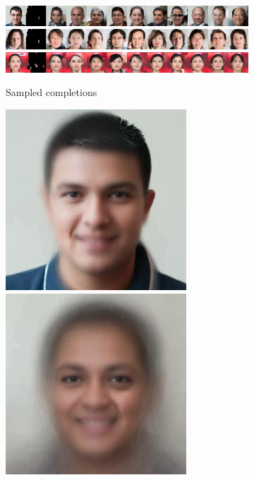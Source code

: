 \begin{figure}[t]
\begin{subfigure}[t]{0.73\textwidth}
    \includegraphics[trim=512px 0px 0px 0px, clip, height=\cmgfailureimgheight]{figs/cigcvae/co_mod_gan_failure/aipo_0_4_2.jpg}
    \includegraphics[trim=512px 0px 0px 0px, clip, height=\cmgfailureimgheight]{figs/cigcvae/co_mod_gan_failure/aipo_1_4_2.jpg}
    \includegraphics[trim=512px 0px 0px 0px, clip, height=\cmgfailureimgheight]{figs/cigcvae/co_mod_gan_failure/aipo_56_4_12.jpg}
    \caption{\scriptsize Sampled completions}
  \end{subfigure}
  \begin{subfigure}[t]{0.1\textwidth}
    \centering
    \includegraphics[height=\cmgfailureimgheight]{figs/cigcvae/co_mod_gan_failure/avg_aipo_0_3_2.jpg}
    \includegraphics[height=\cmgfailureimgheight]{figs/cigcvae/co_mod_gan_failure/avg_aipo_0_4_2.jpg}

\end{subfigure}
\end{figure}
